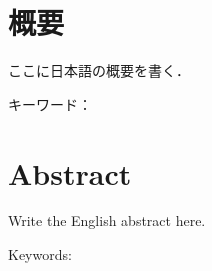 \chapter*{概要}
\thispagestyle{empty}
\begin{center}
\end{center}
\vspace{1.0zh}

ここに日本語の概要を書く．

\vspace{1.0zh}
\noindent キーワード：

\newpage
\chapter*{Abstract}
\thispagestyle{empty}
\begin{center}
\end{center}
\vspace{1.0zh}

Write the English abstract here.

\vspace{1.0zh}
\noindent Keywords:
